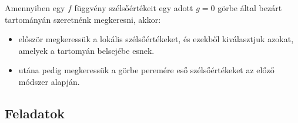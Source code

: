 \documentclass[a4paper, 12pt]{scrartcl}
\begin{document}
\begin{blueBox}

  Amennyiben egy $f$ függvény szélsőértékeit egy adott $g = 0$ görbe által
  bezárt tartományán szeretnénk megkeresni, akkor:
  \begin{itemize}
    \item először megkeressük a lokális szélsőértékeket, és ezekből kiválasztjuk
          azokat, amelyek a tartomyán belsejébe esnek.
    \item utána pedig megkeressük a görbe peremére eső szélsőértékeket az előző
          módszer alapján.
  \end{itemize}
\end{blueBox}


\clearpage
\subsection{Feladatok}
\end{document}
